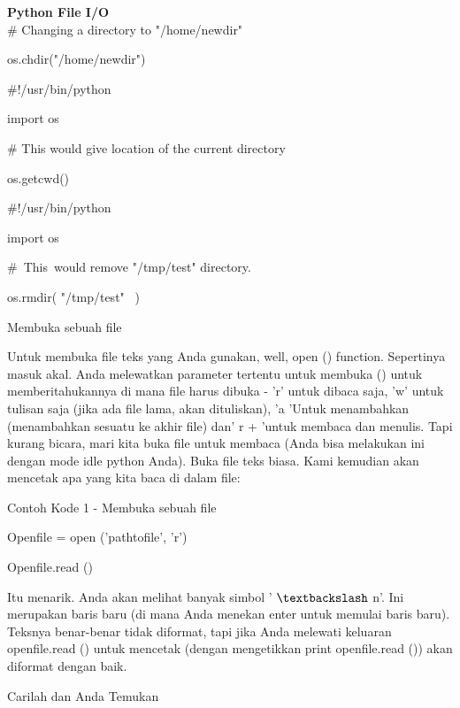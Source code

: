 \begin{center}{\fontsize{24pt}{24pt}\selectfont \textbf{Python File I/O} \\}
 $  \#  $ Changing a directory to "/home/newdir" 
 
os.chdir("/home/newdir") 
\vspace{14pt}

 $  \#  $!/usr/bin/python 
 
import os
\vspace{12pt}

 $  \#  $ This would give location of the current directory 
 
os.getcwd() 
\vspace{14pt}
 
 $  \#  $!/usr/bin/python 

import os 
\vspace{12pt}

 $  \#  $~This~would  remove "/tmp/test"  directory. 
 
os.rmdir( "/tmp/test"~ ) 
\vspace{14pt}
\vspace{14pt}
 
Membuka sebuah file 

\vspace{12pt}

Untuk membuka file teks yang Anda gunakan, well, open () function. Sepertinya masuk akal. Anda melewatkan parameter tertentu untuk membuka () untuk memberitahukannya di mana file harus dibuka - 'r' untuk dibaca saja, 'w' untuk tulisan saja (jika ada file lama, akan dituliskan), 'a 'Untuk menambahkan (menambahkan sesuatu ke akhir file) dan' r + 'untuk membaca dan menulis. Tapi kurang bicara, mari kita buka file untuk membaca (Anda bisa melakukan ini dengan mode idle python Anda). Buka file teks biasa. Kami kemudian akan mencetak apa yang kita baca di dalam file: 

Contoh Kode 1 - Membuka sebuah file 

\vspace{12pt}

Openfile = open ('pathtofile', 'r')

Openfile.read () 

\vspace{12pt}

Itu menarik. Anda akan melihat banyak simbol ' $  \textbackslash  $ n'. Ini merupakan baris baru (di mana Anda menekan enter untuk memulai baris baru). Teksnya benar-benar tidak diformat, tapi jika Anda melewati keluaran openfile.read () untuk mencetak (dengan mengetikkan print openfile.read ()) akan diformat dengan baik. 

Carilah dan Anda Temukan 


\end{center}
